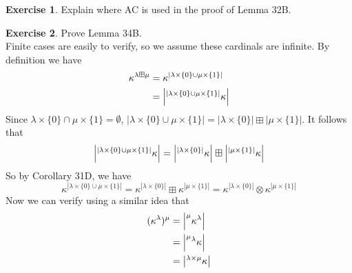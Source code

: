 \documentclass{article}
\theoremstyle{definition}
\newtheorem{exercise}{Exercise}[section]
\newcommand{\so}{\text{\textbf{Solution: }}}
\begin{document}
    \begin{exercise}
        Explain where AC is used in the proof of Lemma 32B.
    \end{exercise}
    \begin{exercise}
        Prove Lemma 34B.\vspace{1em}\\
        \so Finite cases are easily to verify, so we assume these cardinals are infinite. By definition we have 
        \begin{align*}
            \kappa^{\lambda \boxplus \mu} &= \kappa^{|\lambda \times \{0\} \cup \mu\times \{1\}|}\\
            &= \left |\prescript{|\lambda \times \{0\} \cup \mu\times \{1\}|}{}{\kappa}\right|
        \end{align*}
        Since $\lambda \times \{0\} \cap \mu\times \{1\} = \emptyset$, $|\lambda \times \{0\} \cup \mu\times \{1\}| = |\lambda \times \{0\} | \boxplus |\mu\times \{1\}|$. It follows that 
        $$\left |\prescript{|\lambda \times \{0\} \cup \mu\times \{1\}|}{}{\kappa}\right| = \left |\prescript{|\lambda \times \{0\} |}{}{\kappa}\right| \boxplus \left |\prescript{|\mu\times \{1\}|}{}{\kappa}\right|$$
        So by Corollary 31D, we have 
        $$ \kappa^{|\lambda \times \{0\} \cup \mu\times \{1\}|} = \kappa^{|\lambda \times \{0\}|} \boxplus \kappa^{| \mu\times \{1\}|} = \kappa^{|\lambda \times \{0\}|} \otimes \kappa^{| \mu\times \{1\}|}$$
        Now we can verify using a similar idea that 
        \begin{align*}
            (\kappa^\lambda)^\mu &= \left |\prescript{\mu}{}{\kappa^\lambda}\right|\\
            &= \left| \prescript{\mu}{}{\prescript{\lambda}{}{\kappa}}\right|\\
            &= \left | \prescript{\lambda \times \mu}{}{\kappa} \right |
        \end{align*}
    \end{exercise}
\end{document}
